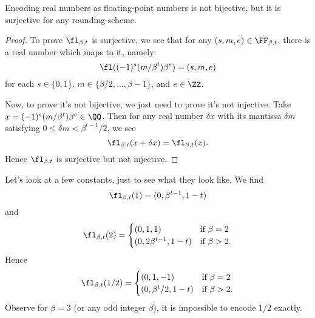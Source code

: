\begin{thm}
Encoding real numbers as floating-point numbers is not bijective, but it
is surjective for any rounding-scheme.
\end{thm}
\begin{proof}
To prove $\fl_{\beta,t}$ is surjective, we see that for any $(s,m,e)\in\FF_{\beta,t}$,
there is a real number which maps to it, namely:
\begin{equation}
  \fl((-1)^{s}(m/\beta^{t})\beta^{e}) = (s,m,e)
\end{equation}
for each $s\in\{0,1\}$, $m\in\{\beta/2,\dots,\beta-1\}$, and $e\in\ZZ$.

Now, to prove it's not bijective, we just need to prove it's not
injective. Take $x = (-1)^{s}(m/\beta^{t})\beta^{e}\in\QQ$. Then for
any real number $\delta x$ with its mantissa $\delta m$ satisfying
$0\leq \delta m<\beta^{t-1}/2$, we see
\begin{equation}
  \fl_{\beta,t}(x + \delta x) = \fl_{\beta,t}(x).
\end{equation}
Hence $\fl_{\beta,t}$ is surjective but not injective.
\end{proof}

\begin{ex}
  Let's look at a few constants, just to see what they look like. We find
  \begin{equation}
    \fl_{\beta,t}(1) = (0, \beta^{t-1}, 1-t)
  \end{equation}
  and
  \begin{equation}
    \fl_{\beta,t}(2) = \begin{cases}
      (0, 1, 1) & \mbox{if $\beta=2$}\\
      (0, 2\beta^{t-1}, 1-t)  & \mbox{if $\beta>2$}.
    \end{cases}
  \end{equation}
  Hence
  \begin{equation}
    \fl_{\beta,t}(1/2) = \begin{cases}
      (0, 1, -1) & \mbox{if $\beta=2$}\\
      (0, \beta^{t}/2, 1-t)  & \mbox{if $\beta>2$}.
    \end{cases}
  \end{equation}
  Observe for $\beta=3$ (or any odd integer $\beta$), it is impossible
  to encode $1/2$ exactly.
\end{ex}

